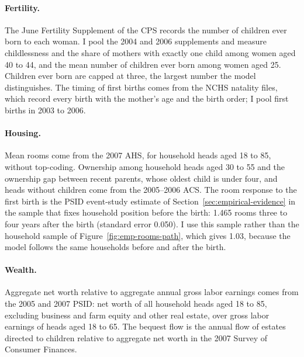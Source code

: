 \paragraph{Fertility.} The June Fertility Supplement of the CPS records the
number of children ever born to each woman. I pool the 2004 and 2006
supplements and measure childlessness and the share of mothers with exactly
one child among women aged 40 to 44, and the mean number of children ever born
among women aged 25. Children ever born are capped at three, the largest
number the model distinguishes. The timing of first births comes from the
NCHS natality files, which record every birth with the mother's age and the
birth order; I pool first births in 2003 to 2006.

\paragraph{Housing.} Mean rooms come from the 2007 AHS, for household heads
aged 18 to 85, without top-coding. Ownership among household heads aged 30 to
55 and the ownership gap between recent parents, whose oldest child is under
four, and heads without children come from the 2005--2006 ACS.
The room response to the first birth is the PSID event-study estimate of
Section~\ref{sec:empirical-evidence} in the sample that fixes household
position before the birth: 1.465 rooms three to four years after the birth
(standard error 0.050). I use this sample rather than the household sample of
Figure~\ref{fig:emp-rooms-path}, which gives 1.03, because the model follows
the same households before and after the birth.

\paragraph{Wealth.} Aggregate net worth relative to aggregate annual gross
labor earnings comes from the 2005 and 2007 PSID: net worth of all household
heads aged 18 to 85, excluding business and farm equity and other real
estate, over gross labor earnings of heads aged 18 to 65. The bequest flow is
the annual flow of estates directed to children relative to aggregate net
worth in the 2007 Survey of Consumer Finances.

